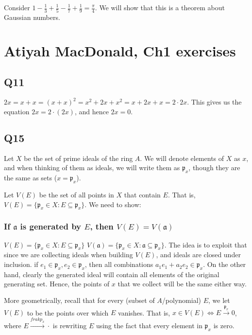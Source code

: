 \documentclass{book}
\newcommand{\frakp}{\ensuremath{\mathfrak{p}}}
\newcommand{\fraka}{\ensuremath{\mathfrak{a}}}
\theoremstyle{definition}
\begin{document}
Consider $1 - \frac{1}{3} + \frac{1}{5} - \frac{1}{7} + \frac{1}{9} = \frac{\pi}{4}$.
We will show that this is a theorem about Gaussian numbers.


\chapter{Atiyah MacDonald, Ch1 exercises}

\section{Q11}
$2x = x + x = (x+x)^2 = x^2 + 2x + x^2 = x + 2x + x = 2 \cdot 2x$. This gives
us the equation $2x = 2 \cdot (2x)$, and hence $2x = 0$.

\section{Q15}

Let $X$ be the set of prime ideals of the ring $A$. 
We will denote elements of $X$ as $x$, and when thinking of them as ideals,
we will write them as $\frakp_x$, though they are the same as sets ($x = \frakp_x$).    

Let $V(E)$ be the set of all points in $X$ that contain $E$. That is,
$V(E) = \{ \frakp_x \in X : E \subseteq \frakp_x \}$. We need to show:

\subsection{If $\fraka$ is generated by $E$, then $V(E) = V(\fraka)$}

$V(E) = \{ \frakp_x \in X : E \subseteq \frakp_x \}$
$V(\fraka) = \{ \frakp_x \in X : \fraka \subseteq \frakp_x \}$. The idea
is to exploit that since we are collecting ideals when building $V(E)$, and ideals
are closed under inclusion. if $e_1 \in \frakp_x, e_2 \in \frakp_x$, then
all combinations $a_1 e_1 + a_2 e_2 \in \frakp_x$. On the other hand, clearly 
the generated ideal will contain all elements of the original generating set.
Hence, the points of $x$ that we collect will be the same either way.


More geometrically, recall that for every (subset of $A$/polynomial) $E$, we let
$V(E)$ to be the points over which $E$ vanishes. That is, $x \in V(E) \iff E \xrightarrow{\frakp_x} 0$, 
where $E \xrightarrow{frakp_x} \cdot$ is rewriting $E$ using the fact that every element in
$\frakp_x$ is zero.
\end{document}
